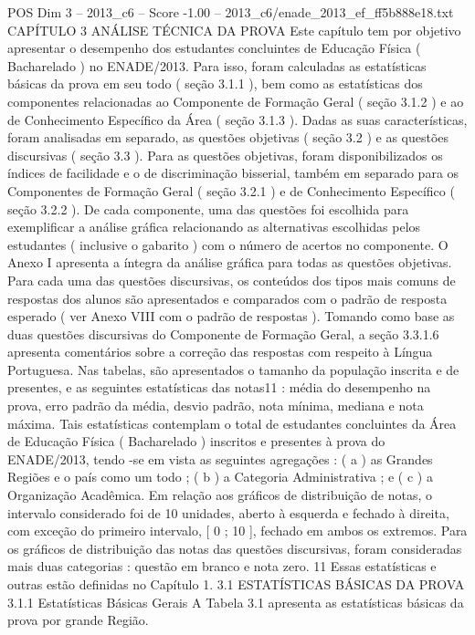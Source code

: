 \begin{textsample}{POS Dim 3 – 2013\_c6 – Score -1.00 – 2013\_c6/enade\_2013\_ef\_ff5b888e18.txt}  \label{ex:f3_pos_227}
CAPÍTULO 3 ANÁLISE TÉCNICA DA PROVA Este capítulo tem por objetivo apresentar o desempenho dos estudantes concluintes de Educação Física ( Bacharelado ) no ENADE/2013.
Para isso, foram calculadas as estatísticas básicas da prova em seu todo ( seção 3.1.1 ), bem como as estatísticas dos componentes relacionadas ao Componente de Formação Geral ( seção 3.1.2 ) e ao de Conhecimento Específico da Área ( seção 3.1.3 ).
Dadas as suas características, foram analisadas em separado, as questões objetivas ( seção 3.2 ) e as questões discursivas ( seção 3.3 ).
Para as questões objetivas, foram disponibilizados os índices de facilidade e o de discriminação bisserial, também em separado para os Componentes de Formação Geral ( seção 3.2.1 ) e de Conhecimento Específico ( seção 3.2.2 ).
De cada componente, uma das questões foi escolhida para exemplificar a análise gráfica relacionando as alternativas escolhidas pelos estudantes ( inclusive o gabarito ) com o número de acertos no componente.
O Anexo I apresenta a íntegra da análise gráfica para todas as questões objetivas.
Para cada uma das questões discursivas, os conteúdos dos tipos mais comuns de respostas dos alunos são apresentados e comparados com o padrão de resposta esperado ( ver Anexo VIII com o padrão de respostas ).
Tomando como base as duas questões discursivas do Componente de Formação Geral, a seção 3.3.1.6 apresenta comentários sobre a correção das respostas com respeito à Língua Portuguesa.
Nas tabelas, são apresentados o tamanho da população inscrita e de presentes, e as seguintes estatísticas das notas11 : média do desempenho na prova, erro padrão da média, desvio padrão, nota mínima, mediana e nota máxima.
Tais estatísticas contemplam o total de estudantes concluintes da Área de Educação Física ( Bacharelado ) inscritos e presentes à prova do ENADE/2013, tendo -se em vista as seguintes agregações : ( a ) as Grandes Regiões e o país como um todo ; ( b ) a Categoria Administrativa ; e ( c ) a Organização Acadêmica.
Em relação aos gráficos de distribuição de notas, o intervalo considerado foi de 10 unidades, aberto à esquerda e fechado à direita, com exceção do primeiro intervalo, [ 0 ; 10 ], fechado em ambos os extremos.
Para os gráficos de distribuição das notas das questões discursivas, foram consideradas mais duas categorias : questão em branco e nota zero. 11 Essas estatísticas e outras estão definidas no Capítulo 1. 3.1 ESTATÍSTICAS BÁSICAS DA PROVA 3.1.1 Estatísticas Básicas Gerais A Tabela 3.1 apresenta as estatísticas básicas da prova por grande Região.

\end{textsample}
